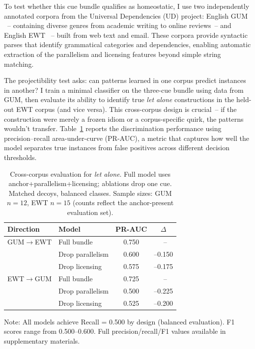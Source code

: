 \documentclass[12pt]{article}
\begin{document}
To test whether this cue bundle qualifies as homeostatic, I use two independently annotated corpora from the Universal Dependencies (UD) project: English GUM \citep{Zeldes2017GUM}~-- containing diverse genres from academic writing to online reviews~-- and English EWT \citep{Silveira2014EWT}~-- built from web text and email. These corpora provide syntactic parses that identify grammatical categories and dependencies, enabling automatic extraction of the parallelism and licensing features beyond simple string matching.

The projectibility test asks: can patterns learned in one corpus predict instances in another? I train a minimal classifier on the three-cue bundle using data from GUM, then evaluate its ability to identify true \textit{let alone} constructions in the held-out EWT corpus (and vice versa). This cross-corpus design is crucial~-- if the construction were merely a frozen idiom or a corpus-specific quirk, the patterns wouldn't transfer. Table~\ref{tab:letalone-eval} reports the discrimination performance using precision–recall area-under-curve (PR-AUC), a metric that captures how well the model separates true instances from false positives across different decision thresholds.

\begin{table}[t]
  \centering
  \caption{Cross-corpus evaluation for \textit{let alone}. Full model uses anchor+parallelism+licensing; ablations drop one cue. Matched decoys, balanced classes. Sample sizes: GUM $n=12$, EWT $n=15$ (counts reflect the anchor-present evaluation set).}
  \label{tab:letalone-eval}
  \begin{tabular}{llcc}
    \toprule
    Direction & Model & PR-AUC & $\Delta$ \\
    \midrule
    GUM$\to$EWT & Full bundle & 0.750 & ~--  \\
                & Drop parallelism & 0.600 & --0.150 \\
                & Drop licensing & 0.575 & --0.175 \\
    \addlinespace
    EWT$\to$GUM & Full bundle & 0.725 & ~--  \\
                & Drop parallelism & 0.500 & --0.225 \\
                & Drop licensing & 0.525 & --0.200 \\
    \bottomrule
  \end{tabular}
  
  \smallskip
  \footnotesize
  Note: All models achieve Recall = 0.500 by design (balanced evaluation). F1 scores range from 0.500--0.600. Full precision/recall/F1 values available in supplementary materials.
  
\end{table}
\end{document}
